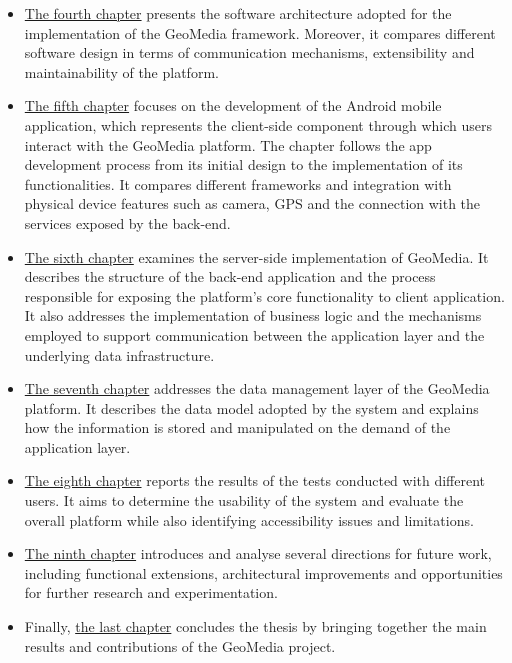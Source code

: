\begin{itemize}
    \item {\hyperref[cap:architecture]{The fourth chapter}} presents the software architecture adopted for the implementation of the GeoMedia framework. Moreover, it compares different software design in terms of communication mechanisms, extensibility and maintainability of the platform.
    \item {\hyperref[cap:mobile]{The fifth chapter}} focuses on the development of the Android mobile application, which represents the client-side component through which users interact with the GeoMedia platform. The chapter follows the app development process from its initial design to the implementation of its functionalities. It compares different frameworks and integration with physical device features such as camera, GPS and the connection with the services exposed by the back-end.
    \item {\hyperref[cap:backend]{The sixth chapter}} examines the server-side implementation of GeoMedia. It describes the structure of the back-end application and the process responsible for exposing the platform's core functionality to client application. It also addresses the implementation of business logic and the mechanisms employed to support communication between the application layer and the underlying data infrastructure.
    \item {\hyperref[cap:datalayer]{The seventh chapter}} addresses the data management layer of the GeoMedia platform. It describes the data model adopted by the system and explains how the information is stored and manipulated on the demand of the application layer.
    \item {\hyperref[cap:testing]{The eighth chapter}} reports the results of the tests conducted with different users. It aims to determine the usability of the system and evaluate the overall platform while also identifying accessibility issues and limitations.
    \item {\hyperref[cap:future_works]{The ninth chapter}} introduces and analyse several directions for future work, including functional extensions, architectural improvements and opportunities for further research and experimentation.
    \item Finally, {\hyperref[cap:conclusions]{the last chapter}} concludes the thesis by bringing together the main results and contributions of the GeoMedia project.
\end{itemize}




